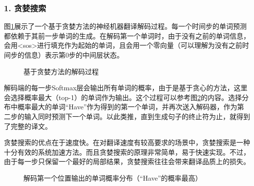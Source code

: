 \vspace{1.0em}
\subsubsection{1. 贪婪搜索}
\vspace{0.6em}
\parinterval 图\ref{fig:10-29}展示了一个基于贪婪方法的神经机器翻译解码过程。每一个时间步的单词预测都依赖于其前一步单词的生成。在解码第一个单词时，由于没有之前的单词信息，会用<sos>进行填充作为起始的单词，且会用一个零向量（可以理解为没有之前时间步的信息）表示第0步的中间层状态。
\vspace{0.8em}

\begin{figure}[htp]
\centering

\caption{基于贪婪方法的解码过程}
\label{fig:10-29}
\end{figure}

\vspace{0.2em}
\parinterval 解码端的每一步Softmax层会输出所有单词的概率，由于是基于贪心的方法，这里会选择概率最大（top-1）的单词作为输出。这个过程可以参考图\ref{fig:10-30}的内容。选择分布中概率最大的单词“Have”作为得到的第一个单词，并再次送入解码器，作为第二步的输入同时预测下一个单词。以此类推，直到生成句子的终止符为止，就得到了完整的译文。

\parinterval 贪婪搜索的优点在于速度快。在对翻译速度有较高要求的场景中，贪婪搜索是一种十分有效的系统加速方法。而且贪婪搜索的原理非常简单，易于快速实现。不过，由于每一步只保留一个最好的局部结果，贪婪搜索往往会带来翻译品质上的损失。

\begin{figure}[htp]
\centering

\caption{解码第一个位置输出的单词概率分布（“Have”的概率最高）}
\label{fig:10-30}
\end{figure}


